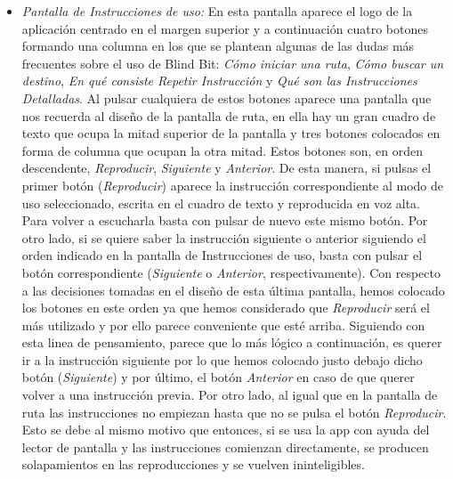 \begin{itemize}
	\item \textit{Pantalla de Instrucciones de uso:} En esta pantalla aparece el logo de la aplicación centrado en el margen superior y a continuación cuatro botones formando una columna en los que se plantean algunas de las dudas más frecuentes sobre el uso de Blind Bit: \textit{Cómo iniciar una ruta}, \textit{Cómo buscar un destino}, \textit{En qué consiste Repetir Instrucción} y \textit{Qué son las Instrucciones Detalladas}. Al pulsar cualquiera de estos botones aparece una pantalla que nos recuerda al diseño de la pantalla de ruta, en ella hay un gran cuadro de texto que ocupa la mitad superior de la pantalla y tres botones colocados en forma de columna que ocupan la otra mitad. Estos botones son, en orden descendente, \textit{Reproducir}, \textit{Siguiente} y \textit{Anterior}. De esta manera, si pulsas el primer botón (\textit{Reproducir}) aparece la instrucción correspondiente al modo de uso seleccionado, escrita en el cuadro de texto y reproducida en voz alta. Para volver a escucharla basta con pulsar de nuevo este mismo botón. Por otro lado, si se quiere saber la instrucción siguiente o anterior siguiendo el orden indicado en la pantalla de Instrucciones de uso, basta con pulsar el botón correspondiente (\textit{Siguiente} o \textit{Anterior}, respectivamente). Con respecto a las decisiones tomadas en el diseño de esta última pantalla, hemos colocado los botones en este orden ya que hemos considerado que \textit{Reproducir} será el más utilizado y por ello parece conveniente que esté arriba. Siguiendo con esta linea de pensamiento, parece que lo más lógico a continuación, es querer ir a la instrucción siguiente por lo que hemos colocado justo debajo dicho botón (\textit{Siguiente}) y por último, el botón \textit{Anterior} en caso de que querer volver a una instrucción previa. Por otro lado, al igual que en la pantalla de ruta las instrucciones no empiezan hasta que no se pulsa el botón \textit{Reproducir}. Esto se debe al mismo motivo que entonces, si se usa la app con ayuda del lector de pantalla y las instrucciones comienzan directamente, se producen solapamientos en las reproducciones y se vuelven ininteligibles.
\end{itemize}

